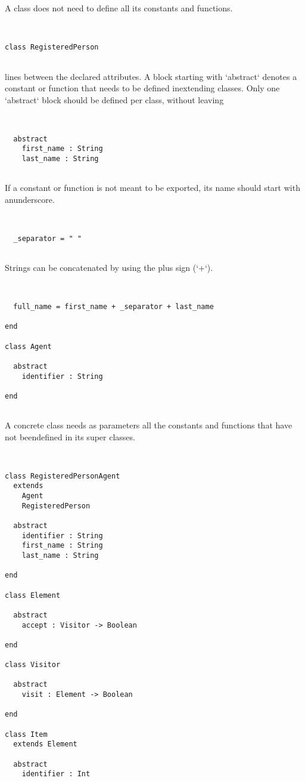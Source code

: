 \documentclass[12pt,a4paper]{article}
\begin{document}
\begin{lstlisting}



\end{lstlisting}

A class does not need to define all its constants and functions. 


\begin{lstlisting}


class RegisteredPerson


\end{lstlisting}

lines between the declared attributes. A block starting with `abstract` denotes a constant or function that needs to be defined inextending classes. Only one `abstract` block should be defined per class, without leaving


\begin{lstlisting}


  abstract
    first_name : String
    last_name : String


\end{lstlisting}

If a constant or function is not meant to be exported, its name should start with anunderscore. 


\begin{lstlisting}


  _separator = " "


\end{lstlisting}

Strings can be concatenated by using the plus sign (`+`). 


\begin{lstlisting}


  full_name = first_name + _separator + last_name

end

class Agent

  abstract
    identifier : String

end


\end{lstlisting}

A concrete class needs as parameters all the constants and functions that have not beendefined in its super classes. 


\begin{lstlisting}


class RegisteredPersonAgent
  extends
    Agent
    RegisteredPerson

  abstract
    identifier : String
    first_name : String
    last_name : String

end

class Element

  abstract
    accept : Visitor -> Boolean

end

class Visitor

  abstract
    visit : Element -> Boolean

end

class Item
  extends Element

  abstract
    identifier : Int


\end{lstlisting}
\end{document}
